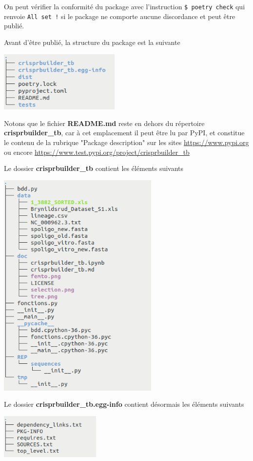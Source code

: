 \documentclass[twoside,a4paper,11pt,frenchb,openany]{report}
\begin{document}
On peut vérifier la conformité du package avec l’instruction
\texttt{\$ poetry check}
qui renvoie
\texttt{All set !}
si le package ne comporte aucune discordance et peut être publié.

Avant d'être publié, la structure du package est la suivante

\includegraphics[width=6cm]{tree_level1.png}

Notons que le fichier \textbf{README.md} reste en dehors du répertoire \textbf{crisprbuilder\_tb}, car à cet emplacement il peut être lu par PyPI, et constitue le contenu de la rubrique "Package description" sur les sites \href{https://www.pypi.org}{https://www.pypi.org} ou encore \href{https://www.test.pypi.org/project/crisprbuilder\_tb}{https://www.test.pypi.org/project/crisprbuilder\_tb}

Le dossier \textbf{crisprbuilder\_tb} contient les éléments suivants

\includegraphics[width=8cm]{rep_crispr.png}

Le dossier \textbf{crisprbuilder\_tb.egg-info} contient désormais les éléments suivants

\includegraphics[width=5cm]{rep_crispr_egg.png}
\end{document}
